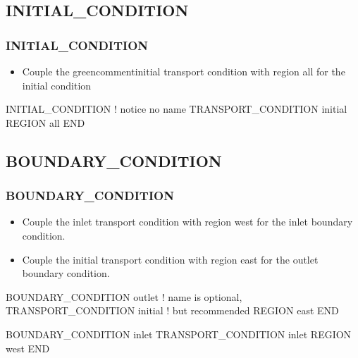 \documentclass{beamer}
\newcommand\redcomment[1]{{{\color{red} #1}}}
\newcommand\bluecomment[1]{{{\color{blue} #1}}}
\newcommand\greencomment[1]{{{\color{green} #1}}}
\begin{document}
\subsection{INITIAL\_CONDITION}

\begin{frame}[fragile]\frametitle{INITIAL\_CONDITION}

\begin{itemize}
\item Couple the greencomment{initial} transport condition with region \greencomment{all} for the initial condition
\end{itemize}

\begin{semiverbatim}

INITIAL_CONDITION               \bluecomment{! notice no name}
  TRANSPORT_CONDITION initial
  REGION all
END

\end{semiverbatim}

\end{frame}

\subsection{BOUNDARY\_CONDITION}

\begin{frame}[fragile]\frametitle{BOUNDARY\_CONDITION}

\begin{itemize}
\item Couple the \greencomment{inlet} transport condition with region \greencomment{west} for the \redcomment{inlet} boundary condition.
\item Couple the \greencomment{initial} transport condition with region \greencomment{east} for the \redcomment{outlet} boundary condition.
\end{itemize}

\begin{semiverbatim}

BOUNDARY_CONDITION outlet      \bluecomment{! name is optional,}
  TRANSPORT_CONDITION initial  \bluecomment{!   but recommended}
  REGION east
END

BOUNDARY_CONDITION inlet
  TRANSPORT_CONDITION inlet
  REGION west
END

\end{semiverbatim}

\end{frame}
\end{document}
